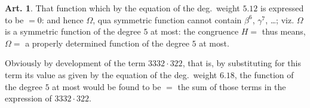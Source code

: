\documentclass[11pt,a4paper]{article}
\theoremstyle{definition}
\newtheorem{art}{Art.}[section]
\begin{document}
\begin{art}
That function which by the equation of the deg.~weight $5.12$ is expressed to be $=0$: and hence $\Omega$, qua symmetric function cannot contain $\beta^6$, $\gamma^7$, \ldots; viz. $\Omega$ is a symmetric function of the degree $5$ at most: the congruence $H = $ thus means, $\Omega = $ a properly determined function of the degree $5$ at most.

Obviously by development of the term $3332 \cdot 322$, that is, by substituting for this term its value as given by the equation of the deg.~weight $6.18$, the function of the degree $5$ at most would be found to be $=$ the sum of those terms in the expression of $3332 \cdot 322$.
\end{art}
\end{document}
